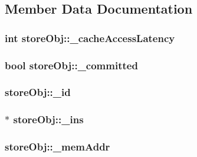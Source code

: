 \subsection{Member Data Documentation}
\hypertarget{structstoreObj_a846024761d730594e3cef0d1292ddccb}{
\subsubsection[{\_\-cacheAccessLatency}]{\setlength{\rightskip}{0pt plus 5cm}int {\bf storeObj::\_\-cacheAccessLatency}}}
\label{structstoreObj_a846024761d730594e3cef0d1292ddccb}
\hypertarget{structstoreObj_a3082afbcdd75cdc3b09c9faadf0a3941}{
\subsubsection[{\_\-committed}]{\setlength{\rightskip}{0pt plus 5cm}bool {\bf storeObj::\_\-committed}}}
\label{structstoreObj_a3082afbcdd75cdc3b09c9faadf0a3941}
\hypertarget{structstoreObj_a993d37ba4f085950507c05564bf99a6a}{
\subsubsection[{\_\-id}]{ {\bf storeObj::\_\-id}}}
\label{structstoreObj_a993d37ba4f085950507c05564bf99a6a}
\hypertarget{structstoreObj_a418139c33f75b4d7700a61b0293518d7}{
\subsubsection[{\_\-ins}]{$\ast$ {\bf storeObj::\_\-ins}}}
\label{structstoreObj_a418139c33f75b4d7700a61b0293518d7}
\hypertarget{structstoreObj_ae4b43c4c368bb40a153821ae78f0958a}{
\subsubsection[{\_\-memAddr}]{ {\bf storeObj::\_\-memAddr}}}
